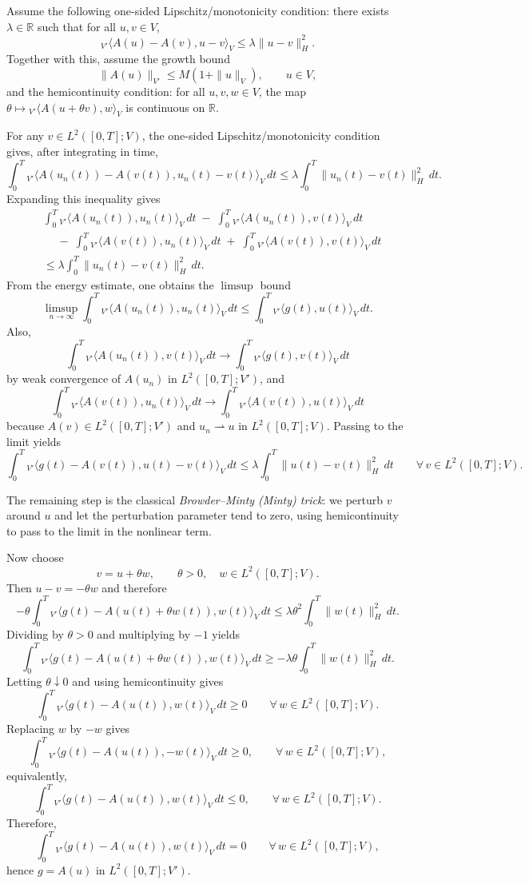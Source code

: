 \documentclass[11pt]{article}
\theoremstyle{definition}
\theoremstyle{remark}
\newcommand{\dual}[2]{{}_{V'}\langle #1, #2 \rangle_{V}}
\begin{document}
Assume the following one-sided Lipschitz/monotonicity condition: there exists
$\lambda\in\mathbb{R}$ such that for all $u,v\in V$,
\[
\dual{A(u)-A(v)}{u-v}
\le
\lambda\|u-v\|_H^2.
\]
Together with this, assume the growth bound
\[
\|A(u)\|_{V'}\le M(1+\|u\|_V),
\qquad u\in V,
\]
and the hemicontinuity condition: for all $u,v,w\in V$, the map
$\theta\mapsto \dual{A(u+\theta v)}{w}$ is continuous on $\mathbb{R}$.

For any $v\in L^2([0,T];V)$, the one-sided Lipschitz/monotonicity condition gives, after
integrating in time,
\[
\int_0^T \dual{A(u_n(t))-A(v(t))}{u_n(t)-v(t)}\,dt
\le
\lambda\int_0^T \|u_n(t)-v(t)\|_H^2\,dt.
\]
Expanding this inequality gives
\[
\begin{aligned}
&\int_0^T \dual{A(u_n(t))}{u_n(t)}\,dt
\;-\;
\int_0^T \dual{A(u_n(t))}{v(t)}\,dt\\
&\quad
\;-\;
\int_0^T \dual{A(v(t))}{u_n(t)}\,dt
\;+\;
\int_0^T \dual{A(v(t))}{v(t)}\,dt\\
&\le \lambda\int_0^T \|u_n(t)-v(t)\|_H^2\,dt.
\end{aligned}
\]
From the energy estimate, one obtains the $\limsup$ bound
\[
\limsup_{n\to\infty}\int_0^T \dual{A(u_n(t))}{u_n(t)}\,dt
\le
\int_0^T \dual{g(t)}{u(t)}\,dt.
\]
Also,
\[
\int_0^T \dual{A(u_n(t))}{v(t)}\,dt
\longrightarrow
\int_0^T \dual{g(t)}{v(t)}\,dt
\]
by weak convergence of $A(u_n)$ in $L^2([0,T];V')$, and
\[
\int_0^T \dual{A(v(t))}{u_n(t)}\,dt
\longrightarrow
\int_0^T \dual{A(v(t))}{u(t)}\,dt
\]
because $A(v)\in L^2([0,T];V')$ and $u_n\rightharpoonup u$ in $L^2([0,T];V)$. Passing to the
limit yields
\[
\int_0^T \dual{g(t)-A(v(t))}{u(t)-v(t)}\,dt
\le
\lambda\int_0^T \|u(t)-v(t)\|_H^2\,dt
\qquad
\forall\,v\in L^2([0,T];V).
\]

The remaining step is the classical \emph{Browder--Minty (Minty) trick}: we perturb $v$ around $u$
and let the perturbation parameter tend to zero, using hemicontinuity to pass to the limit in the
nonlinear term.

Now choose
\[
v=u+\theta w,
\qquad \theta>0,\quad w\in L^2([0,T];V).
\]
Then $u-v=-\theta w$ and therefore
\[
-\theta\int_0^T \dual{g(t)-A(u(t)+\theta w(t))}{w(t)}\,dt
\le
\lambda\theta^2\int_0^T \|w(t)\|_H^2\,dt.
\]
Dividing by $\theta>0$ and multiplying by $-1$ yields
\[
\int_0^T \dual{g(t)-A(u(t)+\theta w(t))}{w(t)}\,dt
\ge
-\lambda\theta\int_0^T \|w(t)\|_H^2\,dt.
\]
Letting $\theta\downarrow 0$ and using hemicontinuity gives
\[
\int_0^T \dual{g(t)-A(u(t))}{w(t)}\,dt \ge 0
\qquad
\forall\,w\in L^2([0,T];V).
\]
Replacing $w$ by $-w$ gives
\[
\int_0^T \dual{g(t)-A(u(t))}{-w(t)}\,dt \ge 0,
\qquad \forall\,w\in L^2([0,T];V),
\]
equivalently,
\[
\int_0^T \dual{g(t)-A(u(t))}{w(t)}\,dt \le 0,
\qquad \forall\,w\in L^2([0,T];V).
\]
Therefore,
\[
\int_0^T \dual{g(t)-A(u(t))}{w(t)}\,dt = 0
\qquad
\forall\,w\in L^2([0,T];V),
\]
hence $g=A(u)$ in $L^2([0,T];V')$.
\end{document}
